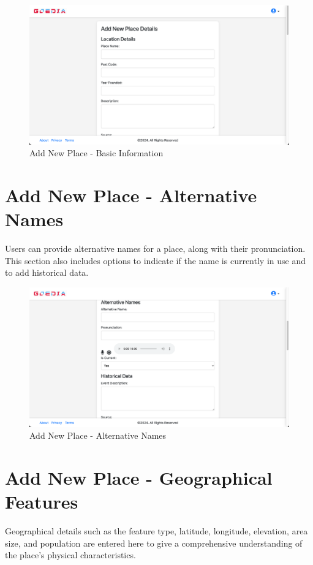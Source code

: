 \begin{figure}[H]
    \centering
    \includegraphics[width=\textwidth]{addnewPlace.png}
    \caption{Add New Place - Basic Information}
    \label{fig:addnewPlace}
\end{figure}

\section{Add New Place - Alternative Names}
Users can provide alternative names for a place, along with their pronunciation. This section also includes options to indicate if the name is currently in use and to add historical data.

\begin{figure}[H]
    \centering
    \includegraphics[width=\textwidth]{addnewPlaceAlternativeName.png}
    \caption{Add New Place - Alternative Names}
    \label{fig:addnewPlaceAlternativeName}
\end{figure}

\section{Add New Place - Geographical Features}
Geographical details such as the feature type, latitude, longitude, elevation, area size, and population are entered here to give a comprehensive understanding of the place's physical characteristics.


